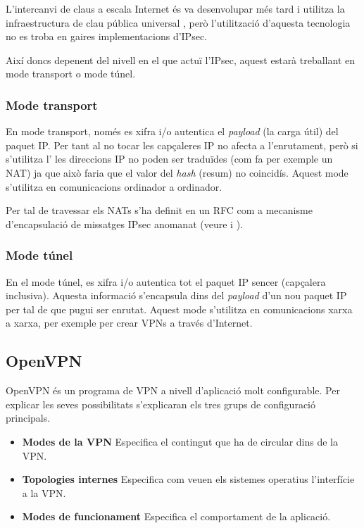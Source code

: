 L'intercanvi de claus a escala Internet és va desenvolupar més tard i utilitza la infraestructura de clau pública universal , però l'utilització d'aquesta tecnologia no es troba en gaires implementacions d'IPsec.

Així doncs depenent del nivell en el que actuï l'IPsec, aquest estarà treballant en mode transport o mode túnel.
\subsubsection{Mode transport}
En mode transport, només es xifra i/o autentica el \emph{payload} (la carga útil) del paquet IP. Per tant al no tocar les capçaleres IP no afecta a l'enrutament, però si s'utilitza l' les direccions IP no poden ser traduïdes (com fa per exemple un NAT) ja que això faria que el valor del \emph{hash} (resum) no coincidís. Aquest mode s'utilitza en comunicacions ordinador a ordinador.

Per tal de travessar els NATs s'ha definit en un RFC com a mecanisme d'encapsulació de missatges IPsec anomanat  (veure \cite{rfc3715} i \cite{rfc3947}).
\subsubsection{Mode túnel}
En el mode túnel, es xifra i/o autentica tot el paquet IP sencer (capçalera inclusiva). Aquesta informació s'encapsula dins del \emph{payload} d'un nou paquet IP per tal de que pugui ser enrutat. Aquest mode s'utilitza en comunicacions xarxa a xarxa, per exemple per crear VPNs a través d'Internet.

\subsection{OpenVPN}
OpenVPN és un programa de VPN a nivell d'aplicació molt configurable. Per explicar les seves possibilitats s'explicaran els tres grups de configuració principals.
\begin{itemize}
\item \textbf{Modes de la VPN}
Especifica el contingut que ha de circular dins de la VPN.
\item \textbf{Topologies internes}
Especifica com veuen els sistemes operatius l'interfície a la VPN.
\item \textbf{Modes de funcionament}
Especifica el comportament de la aplicació.
\end{itemize}

